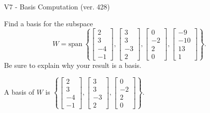\begin{exercise}
  \begin{exerciseTitle}V7 - Basis Computation (ver. 428)\end{exerciseTitle}
  \begin{exerciseStatement}
    Find a basis for the subspace 
\[W=\mathrm{span}\ \left\{\left[\begin{array}{r}
2 \\
3 \\
-4 \\
-1
\end{array}\right] , \left[\begin{array}{r}
3 \\
3 \\
-3 \\
2
\end{array}\right] , \left[\begin{array}{r}
0 \\
-2 \\
2 \\
0
\end{array}\right] , \left[\begin{array}{r}
-9 \\
-10 \\
13 \\
1
\end{array}\right]\right\}.\]
 Be sure to explain why your result is a basis.


  \end{exerciseStatement}
  \begin{exerciseAnswer}
   A basis of \(W\) is  \(\left\{\left[\begin{array}{r}
2 \\
3 \\
-4 \\
-1
\end{array}\right] , \left[\begin{array}{r}
3 \\
3 \\
-3 \\
2
\end{array}\right] , \left[\begin{array}{r}
0 \\
-2 \\
2 \\
0
\end{array}\right]\right\}\).
  


  \end{exerciseAnswer}
\end{exercise}